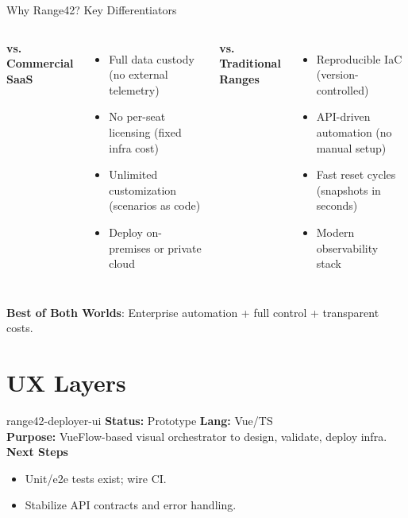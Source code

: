 \documentclass[aspectratio=169]{beamer}
\begin{document}
\begin{frame}{Why Range42? Key Differentiators}
  \begin{columns}[t]
    \textbf{vs. Commercial SaaS} \\[2mm]
    \begin{itemize}
      \item \alert{Full data custody} (no external telemetry)
      \item \alert{No per-seat licensing} (fixed infra cost)
      \item \alert{Unlimited customization} (scenarios as code)
      \item Deploy on-premises or private cloud
    \end{itemize}
    
    \textbf{vs. Traditional Ranges} \\[2mm]
    \begin{itemize}
      \item \alert{Reproducible IaC} (version-controlled)
      \item \alert{API-driven automation} (no manual setup)
      \item \alert{Fast reset cycles} (snapshots in seconds)
      \item Modern observability stack
    \end{itemize}
  \end{columns}
  \vspace{4mm}
  \begin{tcolorbox}
    \faCheckCircle\; \textbf{Best of Both Worlds}: Enterprise automation + full control + transparent costs.
  \end{tcolorbox}
\end{frame}

\section{UX Layers}

\begin{frame}{range42-deployer-ui \; \faDrawPolygon}
  \textbf{Status:} Prototype \hfill \textbf{Lang:} Vue/TS\\[2mm]
  \textbf{Purpose:} VueFlow-based visual orchestrator to design, validate, deploy infra.\\[2mm]
  \textbf{Next Steps}
  \begin{itemize}
    \item Unit/e2e tests exist; wire CI.
    \item Stabilize API contracts and error handling.
  \end{itemize}
\end{frame}
\end{document}
